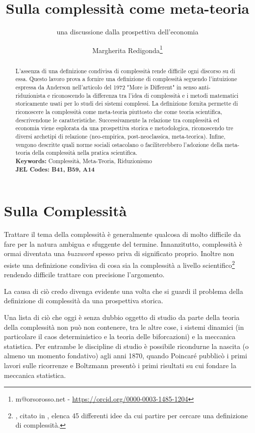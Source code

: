 \documentclass[a4paper, headings=standardclasses]{scrartcl}
\title{Sulla complessità come meta-teoria\let\thefootnote\relax\footnotetext{
		Versioni precedenti di questo lavoro sono state presentate alla 24esima ESHET Summer School e alla 2023 INEM Conference. \\
		L'ultima versione di questo lavoro è disponibile online \url{https://github.com/TnTo/complexity-economics/}.
}}
\subtitle{una discussione dalla prospettiva dell'economia}
\author{Margherita Redigonda\thanks{m@orsorosso.net - \url{https://orcid.org/0000-0003-1485-1204}}}
\begin{document}
	
	\maketitle
	
	\begin{abstract}
		L'assenza di una definizione condivisa di complessità rende difficile ogni discorso su di essa.
		Questo lavoro prova a fornire una definizione di complessità seguendo l'intuizione espressa da Anderson nell'articolo del 1972 "More is Different" in senso anti-riduzionista e riconoscendo la differenza tra l'idea di complessità e i metodi matematici storicamente usati per lo studi dei sistemi complessi. 
		La definizione fornita permette di riconoscere la complessità come meta-teoria piuttosto che come teoria scientifica, descrivendone le caratteristiche.
		Successivamente la relazione tra complessità ed economia viene esplorata da una prospettiva storica e metodologica, riconoscendo tre diversi archetipi di relazione (neo-empirica, post-neoclassica, meta-teorica).
		Infine, vengono descritte quali norme sociali ostacolano o faciliterebbero l'adozione della meta-teoria della complessità nella pratica scientifica. \\
		\textbf{Keywords:} Complessità, Meta-Teoria, Riduzionismo\\
		\textbf{JEL Codes: B41, B59, A14}
	\end{abstract}
	
\section{Sulla Complessità}
Trattare il tema della complessità è generalmente qualcosa di molto difficile da fare per la natura ambigua e sfuggente del termine.
Innanzitutto, complessità è ormai diventata una \textit{buzzword} spesso priva di significato proprio.
Inoltre non esiste una definizione condivisa di cosa sia la complessità a livello scientifico\footnote{\textcite{horgan2015}, citato in \textcite{holt2011}, elenca 45 differenti idee da cui partire per cercare una definizione di complessità.} rendendo difficile trattare con precisione l'argomento.

La causa di ciò credo divenga evidente una volta che si guardi il problema della definizione di complessità da una prospettiva storica. 

Una lista di ciò che oggi è senza dubbio oggetto di studio da parte della teoria della complessità non può non contenere, tra le altre cose, i sistemi dinamici (in particolare il caos deterministico e la teoria delle biforcazioni) e la meccanica statistica. Per entrambe le discipline di studio è possibile ricondurne la nascita (o almeno un momento fondativo) agli anni 1870, quando Poincaré pubblicò i primi lavori sulle ricorrenze e Boltzmann presentò i primi risultati su cui fondare la meccanica statistica.
\end{document}
